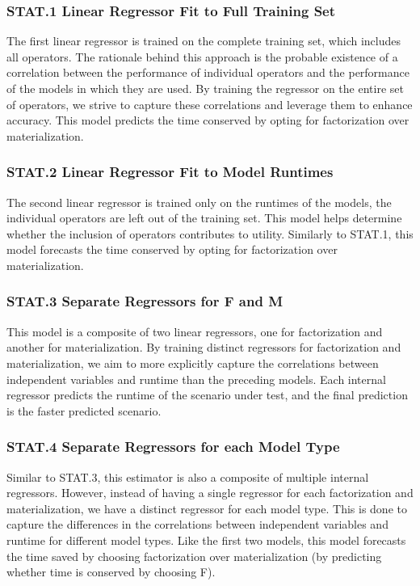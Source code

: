 \subsubsection*{STAT.1 Linear Regressor Fit to Full Training Set}
The first linear regressor is trained on the complete training set, which includes all operators. The rationale behind this approach is the probable existence of a correlation between the performance of individual operators and the performance of the models in which they are used. By training the regressor on the entire set of operators, we strive to capture these correlations and leverage them to enhance accuracy. This model predicts the time conserved by opting for factorization over materialization.

\subsubsection*{STAT.2 Linear Regressor Fit to Model Runtimes}
The second linear regressor is trained only on the runtimes of the models, the individual operators are left out of the training set. This model helps determine whether the inclusion of operators contributes to utility. Similarly to STAT.1, this model forecasts the time conserved by opting for factorization over materialization.

\subsubsection*{STAT.3 Separate Regressors for F and M}
This model is a composite of two linear regressors, one for factorization and another for materialization. By training distinct regressors for factorization and materialization, we aim to more explicitly capture the correlations between independent variables and runtime than the preceding models. Each internal regressor predicts the runtime of the scenario under test, and the final prediction is the faster predicted scenario.

\subsubsection*{STAT.4 Separate Regressors for each Model Type}
Similar to STAT.3, this estimator is also a composite of multiple internal regressors. However, instead of having a single regressor for each factorization and materialization, we have a distinct regressor for each model type. This is done to capture the differences in the correlations between independent variables and runtime for different model types. Like the first two models, this model forecasts the time saved by choosing factorization over materialization (by predicting whether time is conserved by choosing F).

